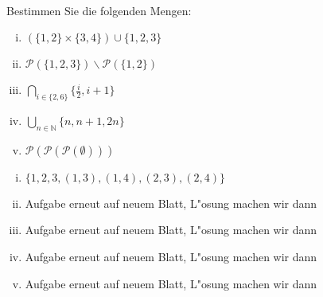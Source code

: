 \newcommand{\printpraesenzlsg}{false}
\newcommand{\printloesungen}{true}
\newcommand{\printbewertungen}{false}
\newcommand{\blattnummer}{2}



\iforiginal{}

	

 \\
Bestimmen Sie die folgenden Mengen:
\begin{enumerate}[(i)]
  \item $(\{1,2\}\times\{3,4\})\cup\{1,2,3\}$
  \item $\mathscr{P}(\{1,2,3\})\backslash\mathscr{P}(\{1,2\})$
  \item $\bigcap_{i\in\{2,6\}}\{\frac{i}{2},i+1\}$ 
  \item $\bigcup_{n\in\mathbb{N}}\{n,n+1,2n\}$
  \item $\mathscr{P}(\mathscr{P}(\mathscr{P}(\emptyset)))$
\end{enumerate}

\begin{loesung}
\begin{enumerate}[(i)]
  \item $\{1,2,3,(1,3),(1,4),(2,3),(2,4)\}$
  \item Aufgabe erneut auf neuem Blatt, L"osung machen wir dann
  \item Aufgabe erneut auf neuem Blatt, L"osung machen wir dann
  \item Aufgabe erneut auf neuem Blatt, L"osung machen wir dann
  \item Aufgabe erneut auf neuem Blatt, L"osung machen wir dann
\end{enumerate}
\end{loesung}

